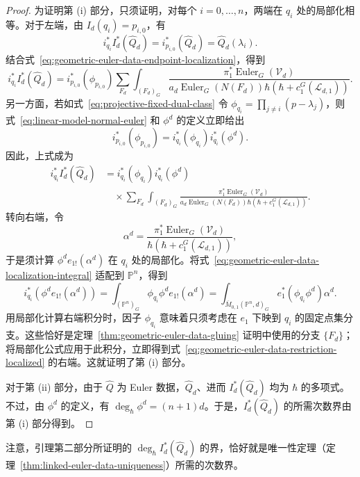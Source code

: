 \begin{proof}
为证明第 (i) 部分，只须证明，对每个 $i=0,\ldots,n$，两端在 $q_i$ 处的局部化相等。对于左端，由 $I_d(q_i)=p_{i,0}$，有
\[
i_{q_i}^*I_d^*(\widehat Q_d)=i_{p_{i,0}}^*(\widehat Q_d)=\widehat Q_d(\lambda_i).
\]
结合式~\eqref{eq:geometric-euler-data-endpoint-localization}，得到
\[
i_{q_i}^*I_d^*(\widehat Q_d)=i_{p_{i,0}}^*(\phi_{p_{i,0}})
\sum_{F_d}\int_{(F_d)_G}
\frac{\pi_1^*\operatorname{Euler}_G(\mathcal V_d)}
{a_d\operatorname{Euler}_G(N(F_d))\hbar(\hbar+c_1^G(\mathcal L_{d,1}))}.
\]
另一方面，若如式~\eqref{eq:projective-fixed-dual-class} 令 $\phi_{q_i}=\prod_{j\ne i}(p-\lambda_j)$，则式~\eqref{eq:linear-model-normal-euler} 和 $\phi^d$ 的定义立即给出
\[
i_{p_{i,0}}^*(\phi_{p_{i,0}})=i_{q_i}^*(\phi_{q_i})i_{q_i}^*(\phi^d).
\]
因此，上式成为
\begin{equation}\label{eq:geometric-euler-data-restriction-localized}
\begin{aligned}
i_{q_i}^*I_d^*(\widehat Q_d)
&=i_{q_i}^*(\phi_{q_i})i_{q_i}^*(\phi^d)\\
&\quad\times\sum_{F_d}\int_{(F_d)_G}
\frac{\pi_1^*\operatorname{Euler}_G(\mathcal V_d)}
{a_d\operatorname{Euler}_G(N(F_d))\hbar(\hbar+c_1^G(\mathcal L_{d,1}))}.
\end{aligned}
\end{equation}
转向右端，令
\[
\alpha^d=\frac{\pi_1^*\operatorname{Euler}_G(\mathcal V_d)}
{\hbar(\hbar+c_1^G(\mathcal L_{d,1}))},
\]
于是须计算 $\phi^d e_{1!}(\alpha^d)$ 在 $q_i$ 处的局部化。将式~\eqref{eq:geometric-euler-data-localization-integral} 适配到 $\mathbb P^n$，得到
\[
i_{q_i}^*(\phi^d e_{1!}(\alpha^d))
=\int_{(\mathbb P^n)_G}\phi_{q_i}\phi^d e_{1!}(\alpha^d)
=\int_{\overline M_{0,1}(\mathbb P^n,d)_G}e_1^*(\phi_{q_i}\phi^d)\alpha^d.
\]
用局部化计算右端积分时，因子 $\phi_{q_i}$ 意味着只须考虑在 $e_1$ 下映到 $q_i$ 的固定点集分支。这些恰好是定理~\ref{thm:geometric-euler-data-gluing} 证明中使用的分支 $\{F_d\}$；将局部化公式应用于此积分，立即得到式~\eqref{eq:geometric-euler-data-restriction-localized} 的右端。这就证明了第 (i) 部分。

对于第 (ii) 部分，由于 $\widehat Q$ 为 Euler 数据，$\widehat Q_d$、进而 $I_d^*(\widehat Q_d)$ 均为 $\hbar$ 的多项式。不过，由 $\phi^d$ 的定义，有 $\deg_\hbar\phi^d=(n+1)d$。于是，$I_d^*(\widehat Q_d)$ 的所需次数界由第 (i) 部分得到。
\end{proof}
注意，引理第二部分所证明的 $\deg_\hbar I_d^*(\widehat Q_d)$ 的界，恰好就是唯一性定理（定理~\ref{thm:linked-euler-data-uniqueness}）所需的次数界。

